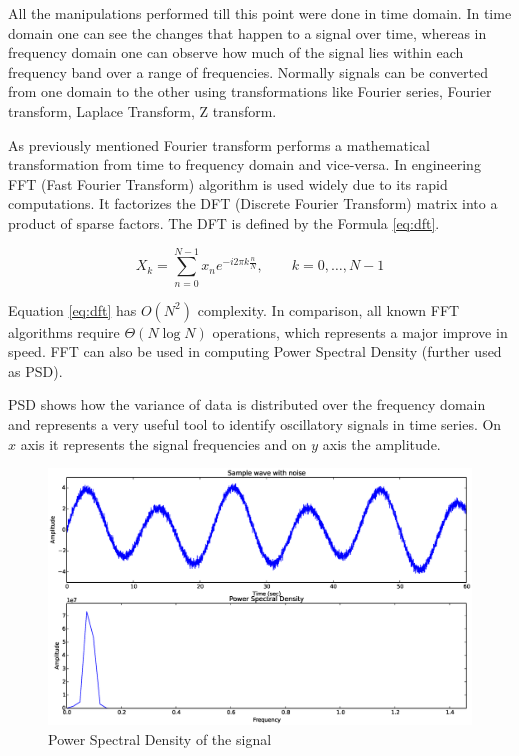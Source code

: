 \documentclass[12pt,a4paper]{report}
\begin{document}
All the manipulations performed till this point were done in time domain. In time domain one can see the changes that happen to a signal over time, whereas in frequency domain one can observe how much of the signal lies within each frequency band over a range of frequencies. Normally signals can be converted from one domain to the other using transformations like Fourier series, Fourier transform, Laplace Transform, Z transform. 

As previously mentioned Fourier transform performs a mathematical transformation from time to frequency domain and vice-versa. In engineering FFT (Fast Fourier Transform) algorithm is used widely due to its rapid computations. It factorizes the DFT (Discrete Fourier Transform) matrix into a product of sparse factors.  The DFT is defined by the Formula \eqref{eq:dft}.

\begin{equation} \label{eq:dft}
 X_k = \sum_{n=0}^{N-1} x_n e^{-i2\pi k\frac{n}{N}}, \qquad k= 0,\ldots , N-1
\end{equation}

Equation \eqref{eq:dft} has $O(N^2)$ complexity. In comparison, all known FFT algorithms require $\Theta (N \log N)$ operations, which represents a major improve in speed. FFT can also be used in computing Power Spectral Density (further used as PSD).

PSD shows how the variance of data is distributed over the frequency domain and represents a very useful tool to identify oscillatory signals in time series. On $x$ axis it represents the signal frequencies and on $y$ axis the amplitude. 

\begin{figure}[h]
\centering
  \includegraphics[max height=\textheight, max width=\textwidth, keepaspectratio, scale=0.7]{11_psd.eps}
\caption{Power Spectral Density of the signal}
\label{fig:psd}
\end{figure}
\end{document}
